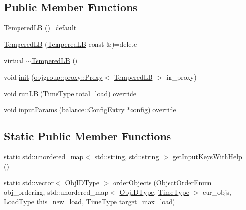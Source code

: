 \subsection*{Public Member Functions}
\begin{DoxyCompactItemize}
\item 
\hyperlink{structvt_1_1vrt_1_1collection_1_1lb_1_1_tempered_l_b_aa891f50b88bc2c43675205fe42f1a1bc}{Tempered\+LB} ()=default
\item 
\hyperlink{structvt_1_1vrt_1_1collection_1_1lb_1_1_tempered_l_b_a95a26dba017d5d4abbdd2e93cb3c32bd}{Tempered\+LB} (\hyperlink{structvt_1_1vrt_1_1collection_1_1lb_1_1_tempered_l_b}{Tempered\+LB} const \&)=delete
\item 
virtual \hyperlink{structvt_1_1vrt_1_1collection_1_1lb_1_1_tempered_l_b_ad8138112521d369244bd38a327c41832}{$\sim$\+Tempered\+LB} ()
\item 
void \hyperlink{structvt_1_1vrt_1_1collection_1_1lb_1_1_tempered_l_b_a57685d91f6518f5e479aba83f779d0f5}{init} (\hyperlink{structvt_1_1objgroup_1_1proxy_1_1_proxy}{objgroup\+::proxy\+::\+Proxy}$<$ \hyperlink{structvt_1_1vrt_1_1collection_1_1lb_1_1_tempered_l_b}{Tempered\+LB} $>$ in\+\_\+proxy)
\item 
void \hyperlink{structvt_1_1vrt_1_1collection_1_1lb_1_1_tempered_l_b_a18efa54b58d642d8bb1cd373514e814f}{run\+LB} (\hyperlink{namespacevt_a876a9d0cd5a952859c72de8a46881442}{Time\+Type} total\+\_\+load) override
\item 
void \hyperlink{structvt_1_1vrt_1_1collection_1_1lb_1_1_tempered_l_b_aec119d63f5af1ce923578b70204ee622}{input\+Params} (\hyperlink{structvt_1_1vrt_1_1collection_1_1balance_1_1_config_entry}{balance\+::\+Config\+Entry} $\ast$config) override
\end{DoxyCompactItemize}
\subsection*{Static Public Member Functions}
\begin{DoxyCompactItemize}
\item 
static std\+::unordered\+\_\+map$<$ std\+::string, std\+::string $>$ \hyperlink{structvt_1_1vrt_1_1collection_1_1lb_1_1_tempered_l_b_a37e3599168c2a90967bd7dc7128c54f0}{get\+Input\+Keys\+With\+Help} ()
\item 
static std\+::vector$<$ \hyperlink{structvt_1_1vrt_1_1collection_1_1lb_1_1_base_l_b_a790b22acf448880599724749cdc4e9b3}{Obj\+I\+D\+Type} $>$ \hyperlink{structvt_1_1vrt_1_1collection_1_1lb_1_1_tempered_l_b_a3cb11a0007b4402dc803a9d2d9d23cd9}{order\+Objects} (\hyperlink{namespacevt_1_1vrt_1_1collection_1_1lb_a3c71e131f84e2ccbb95f43a1058c749c}{Object\+Order\+Enum} obj\+\_\+ordering, std\+::unordered\+\_\+map$<$ \hyperlink{structvt_1_1vrt_1_1collection_1_1lb_1_1_base_l_b_a790b22acf448880599724749cdc4e9b3}{Obj\+I\+D\+Type}, \hyperlink{namespacevt_a876a9d0cd5a952859c72de8a46881442}{Time\+Type} $>$ cur\+\_\+objs, \hyperlink{structvt_1_1vrt_1_1collection_1_1lb_1_1_base_l_b_a215e22b9f12678303f49615ae3be05cc}{Load\+Type} this\+\_\+new\+\_\+load, \hyperlink{namespacevt_a876a9d0cd5a952859c72de8a46881442}{Time\+Type} target\+\_\+max\+\_\+load)
\end{DoxyCompactItemize}
